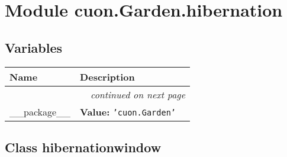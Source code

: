 %
%
%


\section{Module cuon.Garden.hibernation}

    \label{cuon:Garden:hibernation}


  \subsection{Variables}

    \vspace{-1cm}
\hspace{\varindent}\begin{longtable}{|p{\varnamewidth}|p{\vardescrwidth}|l}
\cline{1-2}
\cline{1-2} \centering \textbf{Name} & \centering \textbf{Description}& \\
\cline{1-2}
\endhead\cline{1-2}\multicolumn{3}{r}{\small\textit{continued on next page}}\\\endfoot\cline{1-2}
\endlastfoot\raggedright \_\-\_\-p\-a\-c\-k\-a\-g\-e\-\_\-\_\- & \raggedright \textbf{Value:} 
{\tt \texttt{'}\texttt{cuon.Garden}\texttt{'}}&\\
\cline{1-2}
\end{longtable}



\subsection{Class hibernationwindow}

